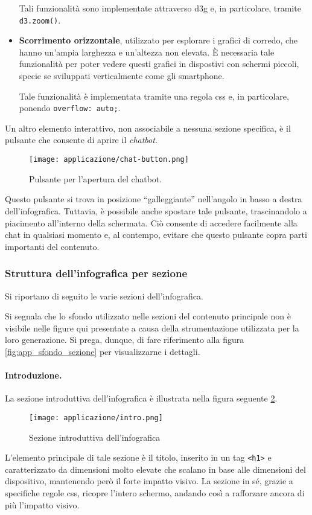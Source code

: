 \begin{itemize}
    Tali funzionalità sono implementate attraverso \gls{d3g} e, in particolare, tramite \texttt{d3.zoom()}.
    \item \textbf{Scorrimento orizzontale}, utilizzato per esplorare i grafici di corredo, che hanno un'ampia larghezza e un'altezza non elevata. È necessaria tale funzionalità per poter vedere questi 
    grafici in dispostivi con schermi piccoli, specie se sviluppati verticalmente come gli smartphone. 
    
    Tale funzionalità è implementata tramite una regola \gls{css} e, in particolare, ponendo \texttt{overflow: auto;}.
\end{itemize}
Un altro elemento interattivo, non associabile a nessuna sezione specifica, è il pulsante che consente di aprire il \emph{chatbot}.
\begin{figure}[H]
    \centering
    \texttt{[image: applicazione/chat-button.png]}
    \caption{Pulsante per l'apertura del chatbot.}
    \label{fig:app_chatbot-button}
\end{figure}
\noindent Questo pulsante si trova in posizione ``galleggiante'' nell'angolo in basso a destra dell'infografica. Tuttavia, è possibile anche spostare tale 
pulsante, trascinandolo a piacimento all'interno della schermata. Ciò consente di accedere facilmente alla chat in qualsiasi momento e, al contempo, evitare che 
questo pulsante copra parti importanti del contenuto.

\subsubsection{Struttura dell'infografica per sezione}
Si riportano di seguito le varie sezioni dell'infografica.

Si segnala che lo sfondo utilizzato nelle sezioni del contenuto principale non è visibile nelle figure qui presentate a causa della strumentazione utilizzata per la loro generazione. 
Si prega, dunque, di fare riferimento alla figura \ref{fig:app_sfondo_sezione} per visualizzarne i dettagli.

\paragraph{Introduzione.} La sezione introduttiva dell'infografica è illustrata nella figura seguente \ref{fig:app_intro}.
\begin{figure}[H] 
    \centering 
    \texttt{[image: applicazione/intro.png]} 
    \caption{Sezione introduttiva dell'infografica}
    \label{fig:app_intro}
\end{figure}
L'elemento principale di tale sezione è il titolo, inserito in un tag \texttt{<h1>} e caratterizzato da dimensioni molto elevate che scalano 
in base alle dimensioni del dispositivo, mantenendo però il forte impatto visivo.
La sezione in sé, grazie a specifiche regole \gls{css}, ricopre l'intero schermo, andando così a rafforzare ancora di più l'impatto visivo. 

